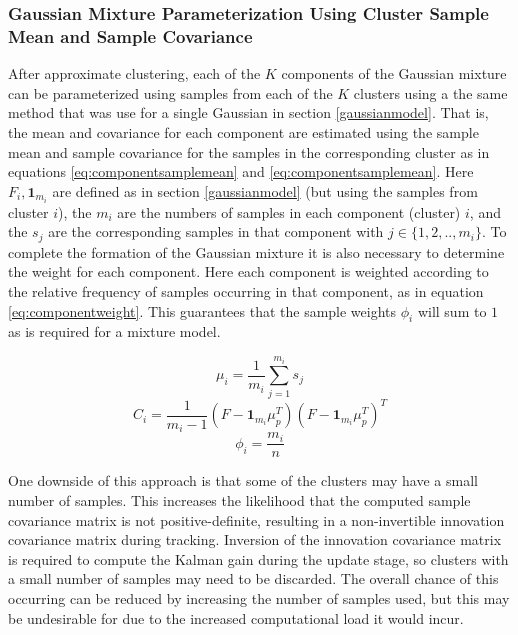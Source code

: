 \documentclass[journal]{IEEEtran}
\begin{document}
\subsubsection{Gaussian Mixture Parameterization Using Cluster Sample Mean and Sample Covariance} \label{gmmparamsmsc}
After approximate clustering, each of the $K$ components of the Gaussian mixture can be parameterized using samples from each of the $K$ clusters using a the same method that was use for a single Gaussian in section \ref{gaussianmodel}. That is, the mean and covariance for each component are estimated using the sample mean and sample covariance for the samples in the corresponding cluster as in equations \ref{eq:componentsamplemean} and \ref{eq:componentsamplemean}. Here $F_i,\mathbf{1}_{m_i}$ are defined as in section \ref{gaussianmodel} (but using the samples from cluster $i$), the $m_i$ are the numbers of samples in each component (cluster) $i$, and the $s_j$ are the corresponding samples in that component with $j \in \{ 1,2,..,m_i \}$. To complete the formation of the Gaussian mixture it is also necessary to determine the weight for each component. Here each component is weighted according to the relative frequency of samples occurring in that component, as in equation \ref{eq:componentweight}. This guarantees that the sample weights $\phi_i$ will sum to $1$ as is required for a mixture model.

\begin{dmath} \label{eq:componentsamplemean}
    {\mu_i = \frac{1}{m_i} \sum_{j = 1}^{m_i} s_j}
\end{dmath}
\begin{dmath} \label{eq:componentsamplecov}
    {C_i = \frac{1}{m_i - 1} (F - \mathbf{1}_{m_i} \mu_p^T) (F - \mathbf{1}_{m_i} \mu_p^T)^T }
\end{dmath}
\begin{dmath} \label{eq:componentweight}
    \phi_i = \frac{m_i}{n}
\end{dmath}

One downside of this approach is that some of the clusters may have a small number of samples. This increases the likelihood that the computed sample covariance matrix is not positive-definite, resulting in a non-invertible innovation covariance matrix during tracking. Inversion of the innovation covariance matrix is required to compute the Kalman gain during the update stage, so clusters with a small number of samples may need to be discarded. The overall chance of this occurring can be reduced by increasing the number of samples used, but this may be undesirable for due to the increased computational load it would incur.
\end{document}
